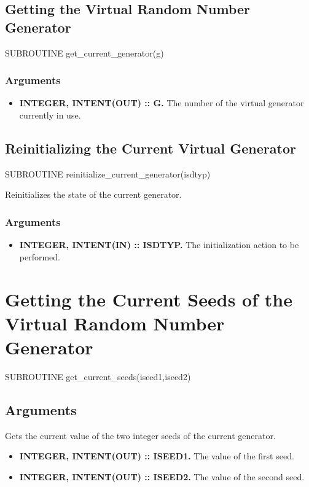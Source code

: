 \documentclass[12pt,dvips]{article}
\newcommand{\mysection}[1]{\color{blue}
            \section{#1} \normalcolor}
\newcommand{\mysubsection}[1] {\color{green}
            \subsection{#1} \normalcolor}
\newcommand{\mysubsubsection}[1]{\color{Orange}
            \subsubsection{#1} \normalcolor}
\newcommand{\myitem}[1]{\item{\bf \color{Violet} #1 \normalcolor}}
\begin{document}
\mysubsection{Getting the Virtual Random Number Generator}

      SUBROUTINE get\_current\_generator(g)

\mysubsubsection{Arguments}

\begin{itemize}

\myitem{INTEGER, INTENT(OUT) :: G.}  The number of the virtual  generator
currently in use.

\end{itemize}

\mysubsection{Reinitializing the Current Virtual Generator}

      SUBROUTINE reinitialize\_current\_generator(isdtyp)

Reinitializes the state of the current generator.

\mysubsubsection{Arguments}

\begin{itemize}

\myitem{INTEGER, INTENT(IN) :: ISDTYP.}  The initialization action to be
performed.


\end{itemize}

\mysection{Getting the Current Seeds of the Virtual Random Number Generator}

      SUBROUTINE get\_current\_seeds(iseed1,iseed2)

\mysubsection{Arguments}

Gets the current value of the two integer seeds of the current generator.

\begin{itemize}

\myitem{INTEGER, INTENT(OUT) :: ISEED1.}  The value of the first seed.

\myitem{INTEGER, INTENT(OUT) :: ISEED2.}  The value of the second seed.

\end{itemize}
\end{document}

